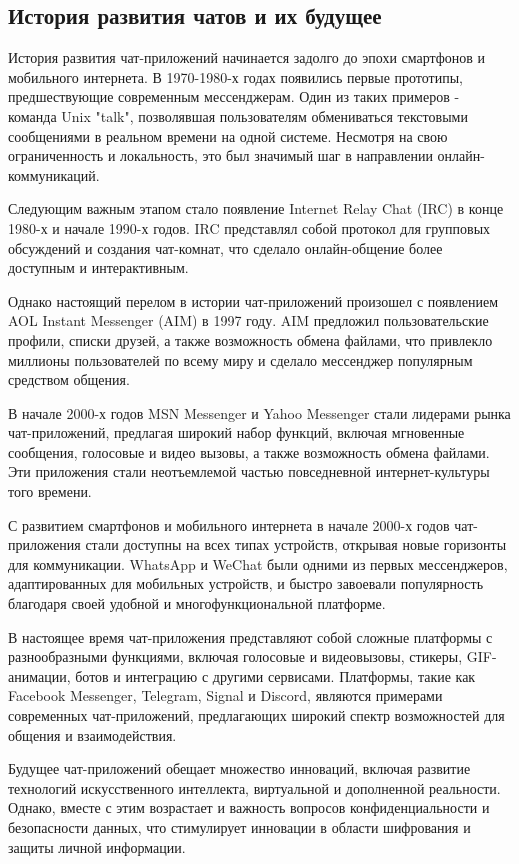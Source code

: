 \subsection{История развития чатов и их будущее}

История развития чат-приложений начинается задолго до эпохи смартфонов и мобильного интернета. В 1970-1980-х годах появились первые прототипы, предшествующие современным мессенджерам. Один из таких примеров - команда Unix "talk", позволявшая пользователям обмениваться текстовыми сообщениями в реальном времени на одной системе. Несмотря на свою ограниченность и локальность, это был значимый шаг в направлении онлайн-коммуникаций.

Следующим важным этапом стало появление Internet Relay Chat (IRC) в конце 1980-х и начале 1990-х годов. IRC представлял собой протокол для групповых обсуждений и создания чат-комнат, что сделало онлайн-общение более доступным и интерактивным.

Однако настоящий перелом в истории чат-приложений произошел с появлением AOL Instant Messenger (AIM) в 1997 году. AIM предложил пользовательские профили, списки друзей, а также возможность обмена файлами, что привлекло миллионы пользователей по всему миру и сделало мессенджер популярным средством общения.

В начале 2000-х годов MSN Messenger и Yahoo Messenger стали лидерами рынка чат-приложений, предлагая широкий набор функций, включая мгновенные сообщения, голосовые и видео вызовы, а также возможность обмена файлами. Эти приложения стали неотъемлемой частью повседневной интернет-культуры того времени.

С развитием смартфонов и мобильного интернета в начале 2000-х годов чат-приложения стали доступны на всех типах устройств, открывая новые горизонты для коммуникации. WhatsApp и WeChat были одними из первых мессенджеров, адаптированных для мобильных устройств, и быстро завоевали популярность благодаря своей удобной и многофункциональной платформе.

В настоящее время чат-приложения представляют собой сложные платформы с разнообразными функциями, включая голосовые и видеовызовы, стикеры, GIF-анимации, ботов и интеграцию с другими сервисами. Платформы, такие как Facebook Messenger, Telegram, Signal и Discord, являются примерами современных чат-приложений, предлагающих широкий спектр возможностей для общения и взаимодействия.

Будущее чат-приложений обещает множество инноваций, включая развитие технологий искусственного интеллекта, виртуальной и дополненной реальности. Однако, вместе с этим возрастает и важность вопросов конфиденциальности и безопасности данных, что стимулирует инновации в области шифрования и защиты личной информации.

